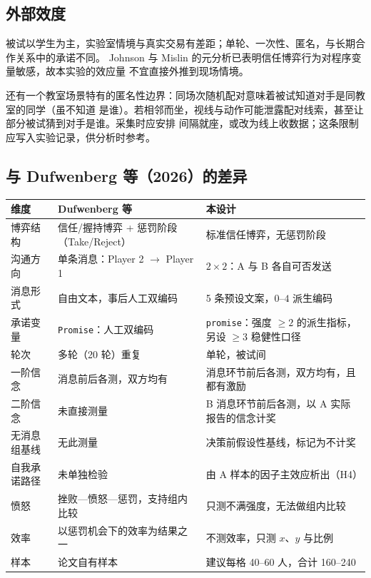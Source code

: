 \documentclass[10pt,a4paper]{ctexart}
\newcommand{\code}[1]{\texttt{#1}}
\begin{document}
\subsection{外部效度}

被试以学生为主，实验室情境与真实交易有差距；单轮、一次性、匿名，与长期合作关系中的承诺不同。
Johnson 与 Mislin\cite{johnson2011} 的元分析已表明信任博弈行为对程序变量敏感，故本实验的效应量
不宜直接外推到现场情境。

还有一个教室场景特有的匿名性边界：同场次随机配对意味着被试知道对手是同教室的同学（虽不知道
是谁）。若相邻而坐，视线与动作可能泄露配对线索，甚至让部分被试猜到对手是谁。采集时应安排
间隔就座，或改为线上收数据；这条限制应写入实验记录，供分析时参考。

\subsection{与 Dufwenberg 等（2026）的差异}

\begin{table}[h]
\centering\small
\begin{tabular}{p{3.3cm}p{4.6cm}p{5.4cm}}
\toprule
维度 & Dufwenberg 等\cite{dufwenberg2026} & 本设计 \\
\midrule
博弈结构 & 信任/握持博弈 + 惩罚阶段（Take/Reject） & 标准信任博弈，无惩罚阶段 \\
沟通方向 & 单条消息：Player 2 $\rightarrow$ Player 1 & $2\times2$：A 与 B 各自可否发送 \\
消息形式 & 自由文本，事后人工双编码 & 5 条预设文案，$0$--$4$ 派生编码 \\
承诺变量 & \texttt{Promise}：人工双编码 & \code{promise}：强度 $\geq 2$ 的派生指标，另设 $\geq 3$ 稳健性口径 \\
轮次 & 多轮（20 轮）重复 & 单轮，被试间 \\
一阶信念 & 消息前后各测，双方均有 & 消息环节前后各测，双方均有，且都有激励 \\
二阶信念 & 未直接测量 & B 消息环节前后各测，以 A 实际报告的信念计奖 \\
无消息组基线 & 无此测量 & 决策前假设性基线，标记为不计奖 \\
自我承诺路径 & 未单独检验 & 由 A 样本的因子主效应析出（H4） \\
愤怒 & 挫败—愤怒—惩罚，支持组内比较 & 只测不满强度，无法做组内比较 \\
效率 & 以惩罚机会下的效率为结果之一 & 不测效率，只测 $x$、$y$ 与比例 \\
样本 & 论文自有样本 & 建议每格 40--60 人，合计 160--240 \\
\bottomrule
\end{tabular}
\end{table}
\end{document}
